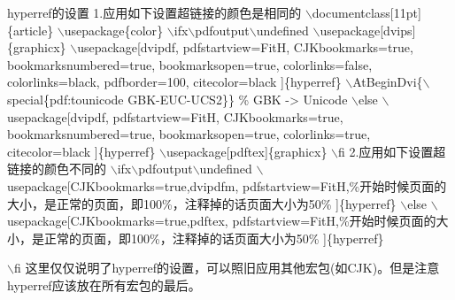 \textcolor[rgb]{0.50,0.00,0.50}{ hyperref的设置} \newline
1.应用如下设置超链接的颜色是相同的 \newline $\backslash
$documentclass[11pt]{\{}article{\}} \newline $\backslash
$usepackage{\{}color{\}} \newline $\backslash $ifx$\backslash
$pdfoutput$\backslash $undefined \newline $\backslash
$usepackage[dvips]{\{}graphicx{\}} \newline $\backslash
$usepackage[dvipdf, \newline pdfstartview=FitH, CJKbookmarks=true,
bookmarksnumbered=true, \newline bookmarksopen=true,
colorlinks=false, colorlinks=black, \newline pdfborder=100,
citecolor=black ]{\{}hyperref{\}} \newline $\backslash
$AtBeginDvi{\{}$\backslash $special{\{}pdf:tounicode
GBK-EUC-UCS2{\}}{\}} {\%} GBK -> Unicode \newline $\backslash $else
\newline $\backslash $usepackage[dvipdf, \newline pdfstartview=FitH,
CJKbookmarks=true, bookmarksnumbered=true, \newline
bookmarksopen=true, colorlinks=true, citecolor=black
]{\{}hyperref{\}}
\newline
$\backslash $usepackage[pdftex]{\{}graphicx{\}} \newline $\backslash
$fi \newline 2.应用如下设置超链接的颜色不同的 \newline $\backslash
$ifx$\backslash $pdfoutput$\backslash $undefined \newline
$\backslash $usepackage[CJKbookmarks=true,dvipdfm, \newline
pdfstartview=FitH,{\%}开始时候页面的大小，是正常的页面，即100{\%}，注释掉的话页面大小为50{\%}
\newline
]{\{}hyperref{\}} $\backslash $else \newline $\backslash
$usepackage[CJKbookmarks=true,pdftex, \newline
pdfstartview=FitH,{\%}开始时候页面的大小，是正常的页面，即100{\%}，注释掉的话页面大小为50{\%}
]{\{}hyperref{\}}

$\backslash $fi \newline
这里仅仅说明了hyperref的设置，可以照旧应用其他宏包(如CJK)。但是注意hyperref应该放在所有宏包的最后。
\newline

